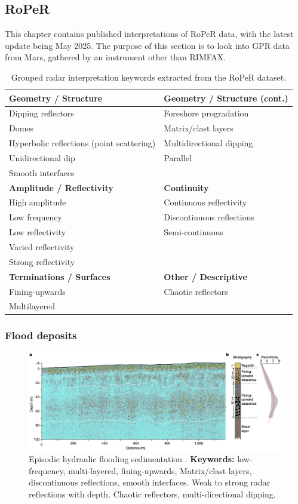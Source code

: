 \clearpage
\subsection{RoPeR}
This chapter contains published interpretations of RoPeR data, with the latest update being May 2025. The purpose of this section is to look into GPR data from Mars, gathered by an instrument other than RIMFAX. 

\begin{table}[h!]
\centering
\caption{Grouped radar interpretation keywords extracted from the RoPeR dataset.}
\begin{tabular}{|p{6.8cm}|p{6.8cm}|}
\hline
\textbf{Geometry / Structure} & \textbf{Geometry / Structure (cont.)} \\
\hline
Dipping reflectors & Foreshore progradation \\
Domes & Matrix/clast layers \\
Hyperbolic reflections (point scattering) & Multidirectional dipping \\
Unidirectional dip & Parallel \\
Smooth interfaces & \\
\hline
\textbf{Amplitude / Reflectivity} & \textbf{Continuity} \\
\hline
High amplitude & Continuous reflectivity\\
Low frequency & Discontinuous reflections \\
Low reflectivity & Semi-continuous \\
Varied reflectivity\\
Strong reflectivity\\
\hline
\textbf{Terminations / Surfaces} & \textbf{Other / Descriptive} \\
\hline
Fining-upwards & Chaotic reflectors \\
Multilayered & \\
\hline
\end{tabular}
\label{tab:roper-keywords}
\end{table}

\subsubsection{Flood deposits}
\begin{figure}[h!]
    \centering
    \includegraphics[width=0.9\linewidth]{Figures/0.6RoPeR/Li2022_1.png}
    \caption[Episodic hydraulic flooding sedimentation]{Episodic hydraulic flooding sedimentation \citep{Li2022}. \textbf{Keywords:} low-frequency, multi-layered, fining-upwards, Matrix/clast layers, discontinuous reflections, smooth interfaces. Weak to strong radar reflections with depth. Chaotic reflectors, multi-directional dipping.}
    \label{fig:Li2022-1}
\end{figure}
\clearpage
